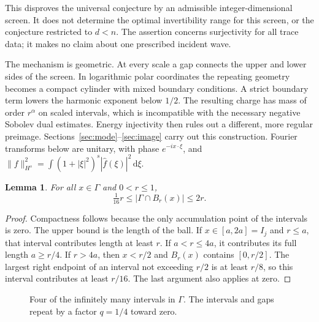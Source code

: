 \documentclass[11pt]{article}
\newtheorem{lemma}[theorem]{Lemma}
\newcommand{\dd}{\,\mathrm d}
\begin{document}
This disproves the universal conjecture by an admissible integer-dimensional
screen. It does not determine the optimal invertibility range for this
screen, or the conjecture restricted to \(d<n\). The assertion concerns
surjectivity for all trace data; it makes no claim about one prescribed
incident wave.

The mechanism is geometric. At every scale a gap connects the upper and
lower sides of the screen. In logarithmic polar coordinates the repeating
geometry becomes a compact cylinder with mixed boundary conditions. A
strict boundary term lowers the harmonic exponent below \(1/2\).
The resulting charge has mass of order \(r^\alpha\) on scaled intervals,
which is incompatible with the necessary negative Sobolev dual estimates.
Energy injectivity then rules out a different, more regular preimage.
Sections~\ref{sec:mode}--\ref{sec:image} carry out this construction.
Fourier transforms below are unitary, with phase \(e^{-ix\cdot\xi}\), and
\(\|f\|_{H^s}^2=\int(1+|\xi|^2)^s|\widehat f(\xi)|^2\dd\xi\).

\begin{lemma}\label{lem:ahlfors}
For all \(x\in\Gamma\) and \(0<r\le1\),
\[
 \tfrac1{16}r\le|\Gamma\cap B_r(x)|\le2r .
\]
\end{lemma}
\begin{proof}
Compactness follows because the only accumulation point of the intervals
is zero. The upper bound is the length of the ball. If \(x\in[a,2a]=I_j\)
and \(r\le a\), that interval contributes length at least \(r\).
If \(a<r\le4a\), it contributes its full length \(a\ge r/4\).
If \(r>4a\), then \(x<r/2\) and \(B_r(x)\) contains \([0,r/2]\).
The largest right endpoint of an interval not exceeding \(r/2\) is at
least \(r/8\), so this interval contributes at least \(r/16\).
The last argument also applies at zero.
\end{proof}

\begin{figure}[ht]
\centering
{}
\caption{Four of the infinitely many intervals in \(\Gamma\).
The intervals and gaps repeat by a factor \(q=1/4\) toward zero.}
\label{fig:screen}
\end{figure}
\end{document}
